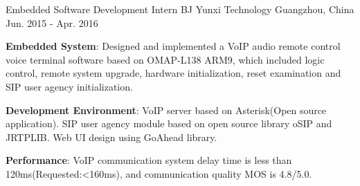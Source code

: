 \begin{cventries}
  \cventry
    {Embedded Software Development Intern} %
    {BJ Yunxi Technology} %
    {Guangzhou, China} %
    {Jun. 2015 - Apr. 2016} %
    {
      \begin{cvitems} %
        \item {\textbf{Embedded System}: Designed and implemented a VoIP audio remote control voice terminal software based on OMAP-L138 ARM9, which included logic control, remote system upgrade, hardware initialization, reset examination and SIP user agency initialization.}
        \item  {\textbf{Development Environment}: VoIP server based on Asterisk(Open source application). SIP user agency module based on open source library oSIP and JRTPLIB. Web UI design using GoAhead library.}
        \item  {\textbf{Performance}: VoIP communication system delay time is less than 120ms(Requested:<160ms), and communication quality MOS is 4.8/5.0.}
      \end{cvitems}
    }

\end{cventries}
